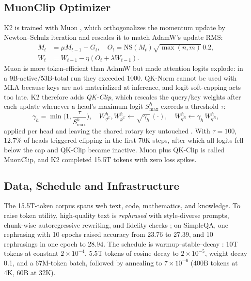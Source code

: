 \documentclass[10pt,twocolumn,letterpaper]{article}
\begin{document}
\subsection{MuonClip Optimizer}
K2 is trained with Muon \cite{muon,muonscale}, which orthogonalizes the momentum update by Newton--Schulz iteration and rescales it to match AdamW's update RMS:
\begin{equation}
\begin{split}M_t&=\mu M_{t-1}+G_t,\quad O_t=\mathrm{NS}(M_t)\sqrt{\max(n,m)}\,0.2,\\ W_t&=W_{t-1}-\eta(O_t+\lambda W_{t-1}).\end{split}
\end{equation}
Muon is more token-efficient than AdamW but made attention logits explode: in a 9B-active/53B-total run they exceeded 1000. QK-Norm \cite{qknorm} cannot be used with MLA because keys are not materialized at inference, and logit soft-capping acts too late. K2 therefore adds \emph{QK-Clip}, which rescales the query/key weights after each update whenever a head's maximum logit $S^h_{\max}$ exceeds a threshold $\tau$:
\begin{equation}
\gamma_h=\min\!\Big(1,\frac{\tau}{S^h_{\max}}\Big),\quad W^h_{q^C},W^h_{k^C}\!\leftarrow\!\sqrt{\gamma_h}\,(\cdot),\quad W^h_{q^R}\!\leftarrow\!\gamma_h\,W^h_{q^R},
\end{equation}
applied per head and leaving the shared rotary key untouched \cite{kimik2}. With $\tau{=}100$, 12.7\% of heads triggered clipping in the first 70K steps, after which all logits fell below the cap and QK-Clip became inactive. Muon plus QK-Clip is called MuonClip, and K2 completed 15.5T tokens with zero loss spikes.

\subsection{Data, Schedule and Infrastructure}
The 15.5T-token corpus spans web text, code, mathematics, and knowledge. To raise token utility, high-quality text is \emph{rephrased} with style-diverse prompts, chunk-wise autoregressive rewriting, and fidelity checks \cite{wrap,kimik2}; on SimpleQA, one rephrasing with 10 epochs raised accuracy from 23.76 to 27.39, and 10 rephrasings in one epoch to 28.94. The schedule is warmup--stable--decay \cite{wsd}: 10T tokens at constant $2\times10^{-4}$, 5.5T tokens of cosine decay to $2\times10^{-5}$, weight decay 0.1, and a 67M-token batch, followed by annealing to $7\times10^{-6}$ (400B tokens at 4K, 60B at 32K).
\end{document}
